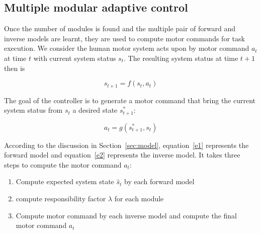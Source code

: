 \subsection{Multiple modular adaptive control}
\label{sec:control}

Once the number of modules is found and the multiple pair of forward and inverse models are learnt, they are used to compute motor commands for task execution.
We consider the human motor system acts upon by motor command $a_t$ at time $t$ with current system status $s_t$. The resulting system status at time $t+1$ then is

\begin{equation}
\label{e1}
s_{t+1} = f\left(s_t,a_t\right)
\end{equation}

The goal of the controller is to generate a motor command that bring the current system status from $s_t$ a desired state $s^*_{t+1}$:

\begin{equation}
\label{e2}
a_t = g\left({s^*_{t+1},s_t}\right)
\end{equation}

According to the discussion in Section~\ref{sec:model}, equation~\ref{e1} represents the forward model and equation~\ref{e2} represents the inverse model. It takes three steps to compute the motor command $a_t$:
\begin{enumerate}
\item Compute expected system state $\hat{s}_t$ by each forward model
\item compute responsibility factor $\lambda$ for each module
\item Compute motor command by each inverse model and compute the final motor command $a_t$
\end{enumerate}


